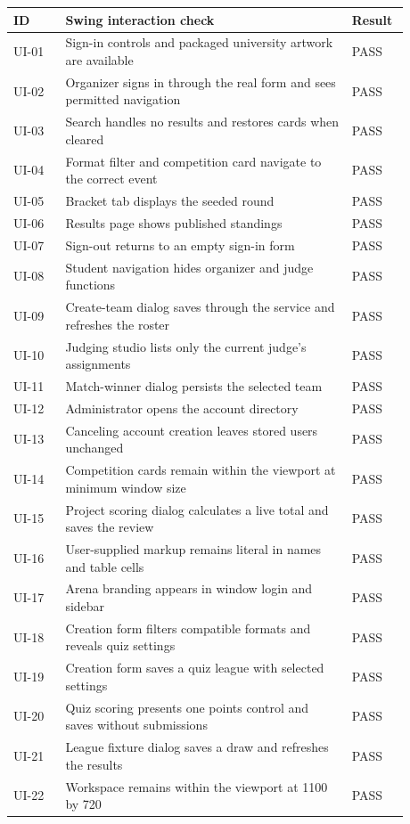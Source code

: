 \begingroup\renewcommand{\arraystretch}{1.05}\footnotesize\begin{longtable}{p{0.12\linewidth}p{0.66\linewidth}p{0.1\linewidth}}\toprule ID & Swing interaction check & Result\\\midrule\endhead
UI-01 & Sign-in controls and packaged university artwork are available & PASS\\
UI-02 & Organizer signs in through the real form and sees permitted navigation & PASS\\
UI-03 & Search handles no results and restores cards when cleared & PASS\\
UI-04 & Format filter and competition card navigate to the correct event & PASS\\
UI-05 & Bracket tab displays the seeded round & PASS\\
UI-06 & Results page shows published standings & PASS\\
UI-07 & Sign-out returns to an empty sign-in form & PASS\\
UI-08 & Student navigation hides organizer and judge functions & PASS\\
UI-09 & Create-team dialog saves through the service and refreshes the roster & PASS\\
UI-10 & Judging studio lists only the current judge's assignments & PASS\\
UI-11 & Match-winner dialog persists the selected team & PASS\\
UI-12 & Administrator opens the account directory & PASS\\
UI-13 & Canceling account creation leaves stored users unchanged & PASS\\
UI-14 & Competition cards remain within the viewport at minimum window size & PASS\\
UI-15 & Project scoring dialog calculates a live total and saves the review & PASS\\
UI-16 & User-supplied markup remains literal in names and table cells & PASS\\
UI-17 & Arena branding appears in window login and sidebar & PASS\\
UI-18 & Creation form filters compatible formats and reveals quiz settings & PASS\\
UI-19 & Creation form saves a quiz league with selected settings & PASS\\
UI-20 & Quiz scoring presents one points control and saves without submissions & PASS\\
UI-21 & League fixture dialog saves a draw and refreshes the results & PASS\\
UI-22 & Workspace remains within the viewport at 1100 by 720 & PASS\\
\bottomrule\end{longtable}\endgroup
